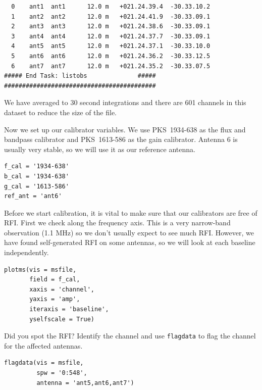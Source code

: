 \documentclass[force,almostfull,justified]{tufte-book}
\begin{document}
\begin{casaoutput}
\begin{verbatim}
  0    ant1  ant1      12.0 m   +021.24.39.4  -30.33.10.2      
  1    ant2  ant2      12.0 m   +021.24.41.9  -30.33.09.1      
  2    ant3  ant3      12.0 m   +021.24.38.6  -30.33.09.1        
  3    ant4  ant4      12.0 m   +021.24.37.7  -30.33.09.1        
  4    ant5  ant5      12.0 m   +021.24.37.1  -30.33.10.0     
  5    ant6  ant6      12.0 m   +021.24.36.2  -30.33.12.5     
  6    ant7  ant7      12.0 m   +021.24.35.2  -30.33.07.5     
##### End Task: listobs              #####
##########################################

\end{verbatim}
\end{casaoutput}

\newpage
We have averaged to 30 second integrations and there are 601 channels in this dataset to reduce the
size of the file.

Now we set up our calibrator variables.  We use PKS~1934-638 as the flux and bandpass calibrator and
PKS~1613-586 as the gain calibrator.  Antenna 6 is usually very stable, so we will use it as our
reference antenna.

\begin{casacmd}
\begin{verbatim}
f_cal = '1934-638'
b_cal = '1934-638'
g_cal = '1613-586'
ref_ant = 'ant6'
\end{verbatim}
\end{casacmd}

Before we start calibration, it is vital to make sure that our calibrators are free of RFI.  First we
check along the frequency axis.  This is a very narrow-band observation (1.1 MHz) so we don't usually
expect to see much RFI.  However, we have found self-generated RFI on some antennas, so we will look
at each baseline independently.

\begin{casacmd}
\begin{verbatim}
plotms(vis = msfile,
       field = f_cal,
       xaxis = 'channel',
       yaxis = 'amp',
       iteraxis = 'baseline',
       yselfscale = True)
\end{verbatim}
\end{casacmd}

Did you spot the RFI?  Identify the channel and use {\tt flagdata} to flag the channel for the
affected antennas.

\begin{casacmd}
\begin{verbatim}
flagdata(vis = msfile,
         spw = '0:548',
         antenna = 'ant5,ant6,ant7')
\end{verbatim}
\end{casacmd}
\end{document}
